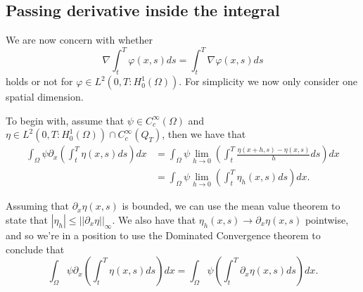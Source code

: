 \documentclass[11pt, a4paper]{article}
\begin{document}
\newpage






\newpage
\begin{appendix}
\section{Passing derivative inside the integral}
\label{sec:derivative}

We are now concern with whether
\begin{equation}
\label{diff_int}
	\nabla \int_t^T \varphi(x,s)ds = \int_t^T \nabla\varphi(x,s)ds
\end{equation}
holds or not for $\varphi \in L^2(0,T:H_0^1 (\Omega))$. 
For simplicity we now only consider one spatial dimension.

To begin with, assume that $\psi \in C^{\infty}_c(\Omega)$ and $\eta \in L^2(0,T: H_0^1(\Omega))\cap C^\infty_c(Q_T)$, then we have that
\begin{align*}
\int_{\Omega}\psi \partial_x\left(\int_t^T \eta(x,s) ds\right)dx &= \int_{\Omega}\psi \lim_{h \to 0}\left(\int_t^T \frac{\eta(x+h,s)-\eta(x,s)}{h} ds\right)dx\\
&= \int_{\Omega}\psi \lim_{h \to 0}\left(\int_t^T \eta_h(x,s) ds\right)dx.
\end{align*}

Assuming that $\partial_x \eta(x,s)$ is bounded, we can use the mean value theorem to state that $|\eta_h| \leq  ||\partial_x \eta||_\infty$. We also have that $\eta_h(x,s) \to \partial_x \eta(x,s)$ pointwise, and so we're in a position to use the Dominated Convergence theorem to conclude that
\begin{equation}
\label{results_diff_first}
\int_{\Omega}\psi \partial_x\left(\int_t^T \eta(x,s) ds\right)dx = \int_{\Omega}\psi \left(\int_t^T \partial_x\eta(x,s) ds\right)dx.
\end{equation}


\end{appendix}
\end{document}
